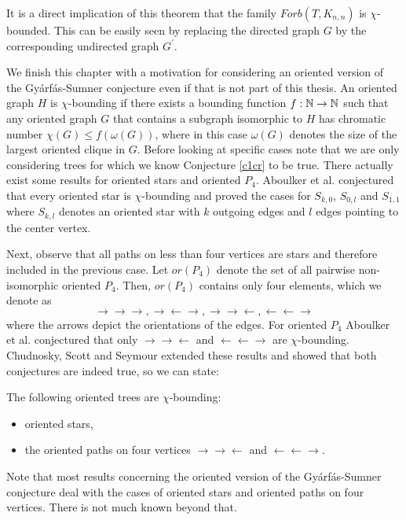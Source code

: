 \begin{note}
It is a direct implication of this theorem that the family $\textit{Forb}(T,K_{n,n})$ is $\chi$-bounded. This can be easily seen by replacing the directed graph $G$ by the corresponding undirected graph $G^\prime$.
\end{note}

We finish this chapter with a motivation for considering an oriented version of the Gyárfás-Sumner conjecture even if that is not part of this thesis. An oriented graph $H$ is $\chi$-bounding if there exists a bounding function $f:\mathbb{N}\to\mathbb{N}$ such that any oriented graph $G$ that contains a subgraph isomorphic to $H$ has chromatic number $\chi (G)\leq f(\omega (G))$, where in this case $\omega (G)$ denotes the size of the largest oriented clique in $G$. Before looking at specific cases note that we are only considering trees for which we know Conjecture \ref{c1cr} to be true. There actually exist some results for oriented stars and oriented $P_4$. Aboulker et al. \cite{Ab16} conjectured that every oriented star is $\chi$-bounding and proved the cases for $S_{k,0}$, $S_{0,l}$ and $S_{1,1}$ where $S_{k,l}$ denotes an oriented star with $k$ outgoing edges and $l$ edges pointing to the center vertex. 

Next, observe that all paths on less than four vertices are stars and therefore included in the previous case. Let $or(P_4)$ denote the set of all pairwise non-isomorphic oriented $P_4$. Then, $or(P_4)$ contains only four elements, which we denote as \[\rightarrow\rightarrow\rightarrow , \rightarrow\leftarrow\rightarrow , \rightarrow\rightarrow\leftarrow , \leftarrow\leftarrow\rightarrow\] where the arrows depict the orientations of the edges. For oriented $P_4$ Aboulker et al. \cite{Ab16} conjectured that only $\rightarrow\rightarrow\leftarrow$ and $\leftarrow\leftarrow\rightarrow$ are $\chi$-bounding. Chudnosky, Scott and Seymour \cite{CSS17b} extended these results and showed that both conjectures are indeed true, so we can state:

\begin{thm}
The following oriented trees are $\chi$-bounding:
\begin{itemize}
\item oriented stars,
\item the oriented paths on four vertices $\rightarrow\rightarrow\leftarrow$ and $\leftarrow\leftarrow\rightarrow$.
\end{itemize}
\end{thm}

Note that most results concerning the oriented version of the Gyárfás-Sumner conjecture deal with the cases of oriented stars and oriented paths on four vertices. There is not much known beyond that.